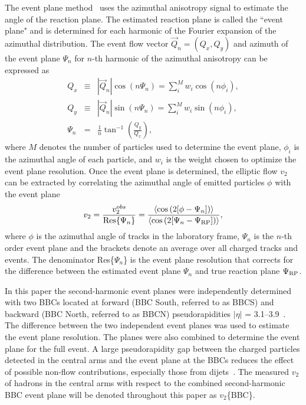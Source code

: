 \documentclass[aps,prc,superscriptaddress,showpacs,floatfix,twocolumn]{revtex4}
\newcommand \RP{\mbox{$\Psi_{\rm{RP}}$}\xspace}
\begin{document}
The event plane method~\cite{Poskanzer:1998yz} uses the azimuthal anisotropy signal to estimate the angle
of the reaction plane. The estimated reaction plane is called 
the ``event plane" and is determined for each 
harmonic of the Fourier expansion of the azimuthal distribution. The event flow vector $\vec{Q}_n = (Q_x, Q_y)$ 
and azimuth of the event plane $\Psi_n$ for $n$-th harmonic of the azimuthal anisotropy can be expressed as
\begin{eqnarray}  %
Q_x & \equiv & |\vec{Q}_n| \cos{(n\Psi_n)} = \sum_i^M w_i \cos{(n\phi_i)}, \label{eq:flowvector_x} \\
Q_y & \equiv & |\vec{Q}_n| \sin{(n\Psi_n)} = \sum_i^M w_i \sin{(n\phi_i)}, \label{eq:flowvector_y} \\
\Psi_n & = & \frac{1}{n} \tan^{-1}\left(\frac{Q_y}{Q_x}\right), \label{eq:eventplane_definition}
\end{eqnarray}
where $M$ denotes the number of particles used to determine the event plane, $\phi_i$ is the azimuthal 
angle of each particle, and $w_i$ is the weight chosen to optimize the event plane resolution. Once 
the event plane is determined, the elliptic flow $v_2$ can be extracted by correlating the azimuthal 
angle of emitted particles $\phi$ with the event plane 
\begin{eqnarray}
v_2 = \frac{v_2^{obs}}{\text{Res}\{\Psi_{n}\}} 
= \frac{\left<\cos{(2[\phi-\Psi_n])}\right>}{\left<\cos{(2[\Psi_{n}-\RP])}\right>},
\end{eqnarray}
where $\phi$ is the azimuthal angle of tracks in the laboratory frame, $\Psi_{n}$ is the $n$-th 
order event plane and the brackets denote an average over all charged tracks and events. The 
denominator Res\{$\Psi_n$\} is the event plane resolution that corrects for the difference 
between the estimated event plane $\Psi_n$ and true reaction plane \RP.

In this paper the second-harmonic event planes were independently determined with two BBCs located at 
forward (BBC South, referred to as BBCS) and backward (BBC North, referred to as BBCN) pseudorapidities 
$|\eta|$ = 3.1--3.9~\cite{Adler:2003kt}. The difference 
between the two independent event planes was 
used to estimate the event plane resolution. The planes were also combined to determine the event plane 
for the full event. A large pseudorapidity gap between the charged particles detected in the central 
arms and the event plane at the BBCs reduces the effect of possible non-flow contributions, especially 
those from dijets~\cite{Jia:2006sb}. The measured $v_2$ of hadrons in the central arms with respect to 
the combined second-harmonic BBC event plane will be denoted throughout this paper as $v_2$\{BBC\}.
\end{document}
